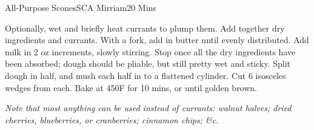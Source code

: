 \begin{recipe}{All-Purpose Scones}{SCA Mirriam}{20 Mins}

  Optionally, wet and briefly heat currants to plump them. Add
  together dry ingredients and currants. With a fork, add in butter
  until evenly distributed. Add milk in 2 oz increments, slowly
  stirring. Stop once all the dry ingredients have been absorbed;
  dough should be pliable, but still pretty wet and sticky. Split
  dough in half, and mush each half in to a flattened cylinder. Cut 6
  isosceles wedges from each. Bake at 450\0F for 10 mins, or until
  golden brown.
\end{recipe}
\textit{Note that most anything can be used instead of currants:
  walnut halves; dried cherries, blueberries, or cranberries; cinnamon
  chips; \&c.}

